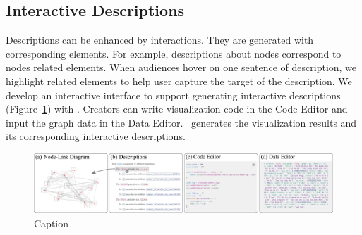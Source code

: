 \subsection{Interactive Descriptions}
Descriptions can be enhanced by interactions.
They are generated with corresponding elements.
For example, descriptions about nodes correspond to nodes related elements.
When audiences hover on one sentence of description, we highlight related elements to help user capture the target of the description.
We develop an interactive interface to support generating interactive descriptions (Figure~\ref{fig:interface}) with \ApproachName.
Creators can write visualization code in the Code Editor and input the graph data in the Data Editor.
\ApproachName~generates the visualization results and its corresponding interactive descriptions.


\begin{figure}[ht]
    \centering
    \includegraphics[width=1\columnwidth]{figures/interface.eps}
    \caption{Caption}
    \label{fig:interface}
\end{figure}